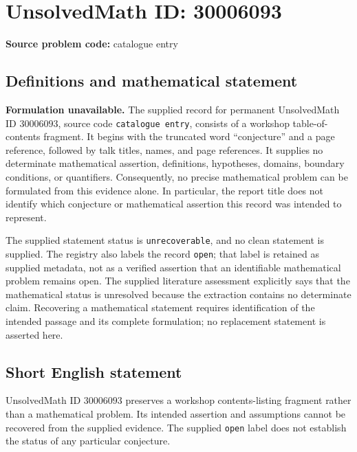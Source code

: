 \documentclass[11pt]{article}
\begin{document}
\section*{UnsolvedMath ID: 30006093}
\textbf{Source problem code:} catalogue entry
\subsection{Definitions and mathematical statement}
\textbf{Formulation unavailable.} The supplied record for permanent UnsolvedMath ID \(30006093\), source code \texttt{catalogue entry}, consists of a workshop table-of-contents fragment. It begins with the truncated word ``conjecture'' and a page reference, followed by talk titles, names, and page references. It supplies no determinate mathematical assertion, definitions, hypotheses, domains, boundary conditions, or quantifiers. Consequently, no precise mathematical problem can be formulated from this evidence alone. In particular, the report title does not identify which conjecture or mathematical assertion this record was intended to represent.

The supplied statement status is \texttt{unrecoverable}, and no clean statement is supplied. The registry also labels the record \texttt{open}; that label is retained as supplied metadata, not as a verified assertion that an identifiable mathematical problem remains open. The supplied literature assessment explicitly says that the mathematical status is unresolved because the extraction contains no determinate claim. Recovering a mathematical statement requires identification of the intended passage and its complete formulation; no replacement statement is asserted here.
\subsection{Short English statement}
UnsolvedMath ID \(30006093\) preserves a workshop contents-listing fragment rather than a mathematical problem. Its intended assertion and assumptions cannot be recovered from the supplied evidence. The supplied \texttt{open} label does not establish the status of any particular conjecture.
\end{document}
